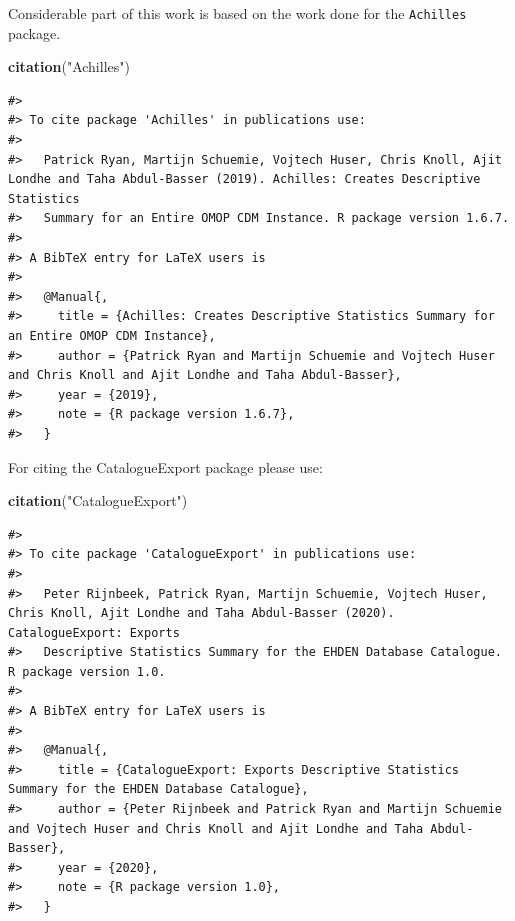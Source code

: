 \documentclass[
]{article}
\newenvironment{Shaded}{\begin{snugshade}}{\end{snugshade}}
\newcommand{\KeywordTok}[1]{\textcolor[rgb]{0.13,0.29,0.53}{\textbf{#1}}}
\newcommand{\NormalTok}[1]{#1}
\newcommand{\StringTok}[1]{\textcolor[rgb]{0.31,0.60,0.02}{#1}}
\begin{document}
Considerable part of this work is based on the work done for the
\texttt{Achilles} package.

\begin{Shaded}
\begin{Highlighting}[]
\KeywordTok{citation}\NormalTok{(}\StringTok{"Achilles"}\NormalTok{)}
\end{Highlighting}
\end{Shaded}

\begin{verbatim}
#> 
#> To cite package 'Achilles' in publications use:
#> 
#>   Patrick Ryan, Martijn Schuemie, Vojtech Huser, Chris Knoll, Ajit Londhe and Taha Abdul-Basser (2019). Achilles: Creates Descriptive Statistics
#>   Summary for an Entire OMOP CDM Instance. R package version 1.6.7.
#> 
#> A BibTeX entry for LaTeX users is
#> 
#>   @Manual{,
#>     title = {Achilles: Creates Descriptive Statistics Summary for an Entire OMOP CDM Instance},
#>     author = {Patrick Ryan and Martijn Schuemie and Vojtech Huser and Chris Knoll and Ajit Londhe and Taha Abdul-Basser},
#>     year = {2019},
#>     note = {R package version 1.6.7},
#>   }
\end{verbatim}

For citing the CatalogueExport package please use:

\begin{Shaded}
\begin{Highlighting}[]
\KeywordTok{citation}\NormalTok{(}\StringTok{"CatalogueExport"}\NormalTok{)}
\end{Highlighting}
\end{Shaded}

\begin{verbatim}
#> 
#> To cite package 'CatalogueExport' in publications use:
#> 
#>   Peter Rijnbeek, Patrick Ryan, Martijn Schuemie, Vojtech Huser, Chris Knoll, Ajit Londhe and Taha Abdul-Basser (2020). CatalogueExport: Exports
#>   Descriptive Statistics Summary for the EHDEN Database Catalogue. R package version 1.0.
#> 
#> A BibTeX entry for LaTeX users is
#> 
#>   @Manual{,
#>     title = {CatalogueExport: Exports Descriptive Statistics Summary for the EHDEN Database Catalogue},
#>     author = {Peter Rijnbeek and Patrick Ryan and Martijn Schuemie and Vojtech Huser and Chris Knoll and Ajit Londhe and Taha Abdul-Basser},
#>     year = {2020},
#>     note = {R package version 1.0},
#>   }
\end{verbatim}
\end{document}

